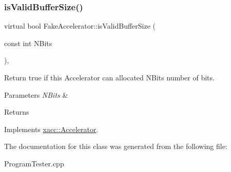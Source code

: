\subsubsection{\texorpdfstring{is\+Valid\+Buffer\+Size()}{isValidBufferSize()}}
{\footnotesize\ttfamily virtual bool Fake\+Accelerator\+::is\+Valid\+Buffer\+Size (\begin{DoxyParamCaption}\item[{const int}]{N\+Bits }\end{DoxyParamCaption})\hspace{0.3cm}{\ttfamily [inline]}, {\ttfamily [virtual]}}

Return true if this Accelerator can allocated N\+Bits number of bits. 
\begin{DoxyParams}{Parameters}
{\em N\+Bits} & \\
\hline
\end{DoxyParams}
\begin{DoxyReturn}{Returns}

\end{DoxyReturn}


Implements \hyperlink{a02432_ae51584850faeec77299058383977ddeb}{xacc\+::\+Accelerator}.



The documentation for this class was generated from the following file\+:\begin{DoxyCompactItemize}
\item 
Program\+Tester.\+cpp\end{DoxyCompactItemize}
